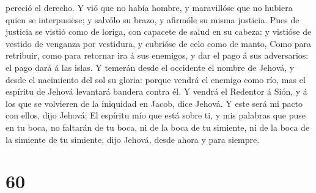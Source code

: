 pereció el derecho.  Y vió que no había hombre, y
maravillóse que no hubiera quien se interpusiese; y salvólo su brazo, y
afirmóle su misma justicia.  Pues de justicia se vistió
como de loriga, con capacete de salud en su cabeza: y vistióse de
vestido de venganza por vestidura, y cubrióse de celo como de manto,
 Como para retribuir, como para retornar ira á sus
enemigos, y dar el pago á sus adversarios: el pago dará á las islas.
 Y temerán desde el occidente el nombre de Jehová, y
desde el nacimiento del sol su gloria: porque vendrá el enemigo como
río, mas el espíritu de Jehová levantará bandera contra él.
 Y vendrá el Redentor á Sión, y á los que se volvieren de
la iniquidad en Jacob, dice Jehová.  Y este será mi pacto
con ellos, dijo Jehová: El espíritu mío que está sobre ti, y mis
palabras que puse en tu boca, no faltarán de tu boca, ni de la boca de
tu simiente, ni de la boca de la simiente de tu simiente, dijo Jehová,
desde ahora y para siempre.

\hypertarget{section-59}{%
\section{60}\label{section-59}}

